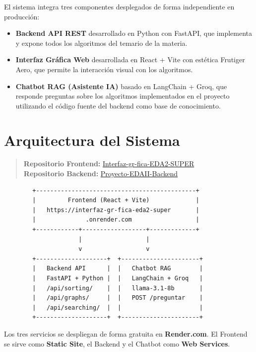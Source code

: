 \documentclass[12pt, letterpaper]{article}
\begin{document}
	El sistema integra tres componentes desplegados de forma independiente en producción:
	
	\begin{itemize}[noitemsep]
		\item \textbf{Backend API REST} desarrollado en Python con FastAPI, que implementa y expone todos los algoritmos del temario de la materia.
		\item \textbf{Interfaz Gráfica Web} desarrollada en React + Vite con estética Frutiger Aero, que permite la interacción visual con los algoritmos.
		\item \textbf{Chatbot RAG (Asistente IA)} basado en LangChain + Groq, que responde preguntas sobre los algoritmos implementados en el proyecto utilizando el código fuente del backend como base de conocimiento.
	\end{itemize}
	
	\section{Arquitectura del Sistema}
	\begin{quote}
		\textbf{Repositorio Frontend:} \href{https://github.com/MarFerNAndaUwU/Interfaz-gr-fica-EDA2-SUPER}{Interfaz-gr-fica-EDA2-SUPER} \\
		\textbf{Repositorio Backend:} \href{https://github.com/FranciscoCou077/Proyecto-EDAII-Backend}{Proyecto-EDAII-Backend}
	\end{quote}
	
	\begin{verbatim}
		+---------------------------------------------+
		|         Frontend (React + Vite)             |
		|   https://interfaz-gr-fica-eda2-super       |
		|              .onrender.com                  |
		+------------+------------------+-------------+
		             |                  |
		             v                  v
		+--------------------+  +----------------------+
		|   Backend API      |  |   Chatbot RAG        |
		|   FastAPI + Python |  |   LangChain + Groq   |
		|   /api/sorting/    |  |   llama-3.1-8b       |
		|   /api/graphs/     |  |   POST /preguntar    |
		|   /api/searching/  |  |                      |
		+--------------------+  +----------------------+
	\end{verbatim}
	
	Los tres servicios se despliegan de forma gratuita en \textbf{Render.com}. El Frontend se sirve como \textbf{Static Site}, el Backend y el Chatbot como \textbf{Web Services}.
	
\end{document}
